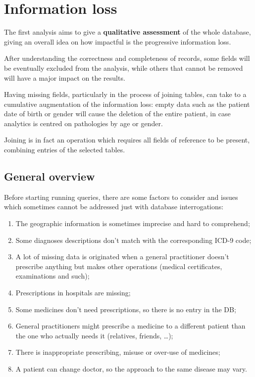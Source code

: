 \chapter{Information loss}

The first analysis aims to give a \textbf{qualitative assessment} of the whole database, giving an overall idea on how impactful is the progressive information loss. 

After understanding the correctness and completeness of records, some fields will be eventually excluded from the analysis, while others that cannot be removed will have a major impact on the results.

Having missing fields, particularly in the process of joining tables, can take to a cumulative augmentation of the information loss: empty data such as the patient date of birth or gender will cause the deletion of the entire patient, in case analytics is centred on pathologies by age or gender.

Joining is in fact an operation which requires all fields of reference to be present, combining entries of the selected tables\cite{DC2}.

\section{General overview}
Before starting running queries, there are some factors to consider and issues which sometimes cannot be addressed just with database interrogations:
\begin{enumerate}
	\item The geographic information is sometimes imprecise and hard to comprehend;
	\item Some diagnoses descriptions don't match with the corresponding ICD-9 code;
	\item A lot of missing data is originated when a general practitioner doesn't prescribe anything but makes other operations (medical certificates, examinations and such);
	\item Prescriptions in hospitals are missing;
	\item Some medicines don't need prescriptions, so there is no entry in the DB;
	\item General practitioners might prescribe a medicine to a different patient than the one who actually needs it (relatives, friends, \dots);
	\item There is inappropriate prescribing, misuse or over-use of medicines;
	\item A patient can change doctor, so the approach to the same disease may vary.
\end{enumerate}

